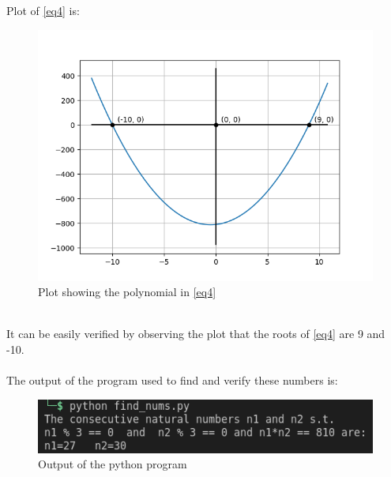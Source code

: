 \documentclass[journal, 12pt, twocolumn]{IEEEtran}
\begin{document}
    Plot of \eqref{eq4} is:
    \begin{figure}[h]
        \centering
        \includegraphics[width=\columnwidth]{plot.png}
        \caption{Plot showing the polynomial in \eqref{eq4}}
        \label{Fig1}
    \end{figure}\\
    It can be easily verified by observing the plot that the roots of \eqref{eq4} are 9 and -10.\\\\

    The output of the program used to find and verify these numbers is:
    \begin{figure}[h]
        \includegraphics[width=\columnwidth]{output.png}
        \caption{Output of the python program}
    \end{figure}
\end{document}
